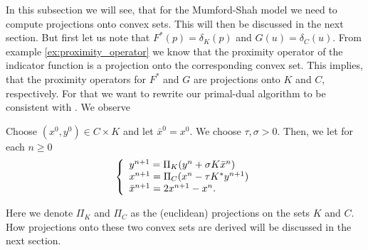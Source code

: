     	In this subsection we will see, that for the Mumford-Shah model we need to compute projections onto convex sets. This will then be discussed in the next section. But first let us note that $F^{\ast}(p) = \delta_{K}(p)$ and $G(u) = \delta_{C}(u)$. From example \ref{ex:proximity_operator} we know that the proximity operator of the indicator function is a projection onto the corresponding convex set. This implies, that the proximity operators for $F^{\ast}$ and $G$ are projections onto $K$ and $C$, respectively. For that we want to rewrite our primal-dual algorithm to be consistent with \cite{Pock-et-al-iccv09}. We observe

    		\begin{algorithm}\label{alg:primal_dual_cremers}
                Choose $(x^{0}, y^{0}) \in C \times K$ and let $\bar{x}^{0} = x^{0}$. We choose $\tau, \sigma > 0$. Then, we let for each $n \ge 0$
                    \begin{equation}
                        \left\{ 
                            \begin{array}{l l}
                              y^{n+1} = \Pi_{K} (y^{n} + \sigma K \bar{x}^{n}) \\
                              x^{n+1} = \Pi_{C} (x^{n} - \tau K^{*} y^{n+1}) \\
                              \bar{x}^{n+1} = 2x^{n+1} - x^{n}.
                            \end{array}
                        \right.
                    \end{equation}
            \end{algorithm}

        Here we denote $\Pi_{K}$ and $\Pi_{C}$ as the (euclidean) projections on the sets $K$ and $C$. How projections onto these two convex sets are derived will be discussed in the next section.
        
